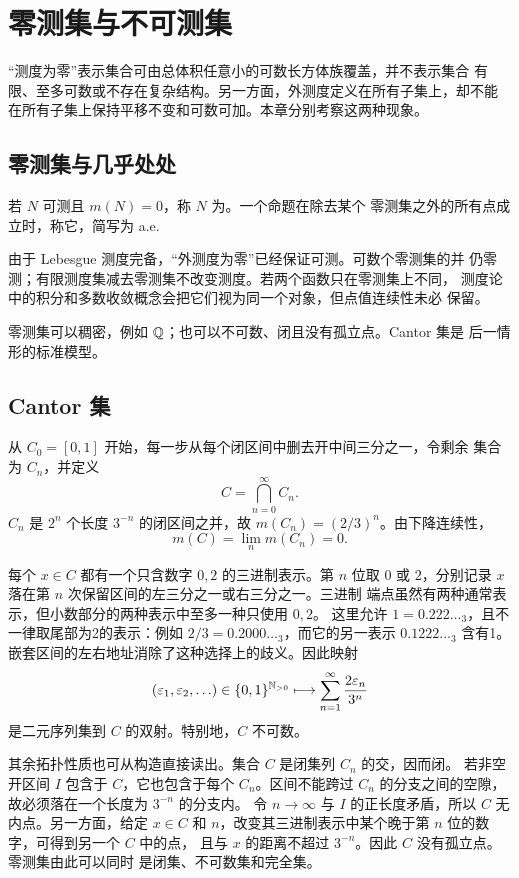 \chapter{零测集与不可测集}
\label{chap:null-nonmeasurable-sets}

“测度为零”表示集合可由总体积任意小的可数长方体族覆盖，并不表示集合
有限、至多可数或不存在复杂结构。另一方面，外测度定义在所有子集上，却不能
在所有子集上保持平移不变和可数可加。本章分别考察这两种现象。

\section{零测集与几乎处处}

\begin{definition}
若 $N$ 可测且 $m(N)=0$，称 $N$ 为。一个命题在除去某个
零测集之外的所有点成立时，称它，简写为 a.e.
\end{definition}

由于 Lebesgue 测度完备，“外测度为零”已经保证可测。可数个零测集的并
仍零测；有限测度集减去零测集不改变测度。若两个函数只在零测集上不同，
测度论中的积分和多数收敛概念会把它们视为同一个对象，但点值连续性未必
保留。

零测集可以稠密，例如 $\mathbb{Q}$；也可以不可数、闭且没有孤立点。Cantor 集是
后一情形的标准模型。

\section{Cantor 集}

从 $C_0=[0,1]$ 开始，每一步从每个闭区间中删去开中间三分之一，令剩余
集合为 $C_n$，并定义
\[
 C=\bigcap_{n=0}^{\infty}C_n.
\]
$C_n$ 是 $2^n$ 个长度 $3^{-n}$ 的闭区间之并，故
$m(C_n)=(2/3)^n$。由下降连续性，
\[
 m(C)=\lim_nm(C_n)=0.
\]

每个 $x\in C$ 都有一个只含数字 $0,2$ 的三进制表示。第 $n$ 位取 $0$ 或
$2$，分别记录 $x$ 落在第 $n$ 次保留区间的左三分之一或右三分之一。三进制
端点虽然有两种通常表示，但小数部分的两种表示中至多一种只使用 $0,2$。
这里允许 $1=0.222\ldots{}_3$，且不一律取尾部为2的表示：例如
$2/3=0.2000\ldots{}_3$，而它的另一表示 $0.1222\ldots{}_3$ 含有1。
嵌套区间的左右地址消除了这种选择上的歧义。因此映射
\[
 (\varepsilon_1,\varepsilon_2,\ldots)\in\{0,1\}^{\mathbb{N}_{>0}}
 \longmapsto \sum_{n=1}^{\infty}\frac{2\varepsilon_n}{3^n}
\]
是二元序列集到 $C$ 的双射。特别地，$C$ 不可数。

其余拓扑性质也可从构造直接读出。集合 $C$ 是闭集列 $C_n$ 的交，因而闭。
若非空开区间 $I$ 包含于 $C$，它也包含于每个 $C_n$。区间不能跨过
$C_n$ 的分支之间的空隙，故必须落在一个长度为 $3^{-n}$ 的分支内。
令 $n\to\infty$ 与 $I$ 的正长度矛盾，所以 $C$ 无内点。另一方面，给定 $x\in C$ 和
$n$，改变其三进制表示中某个晚于第 $n$ 位的数字，可得到另一个 $C$ 中的点，
且与 $x$ 的距离不超过 $3^{-n}$。因此 $C$ 没有孤立点。零测集由此可以同时
是闭集、不可数集和完全集。

